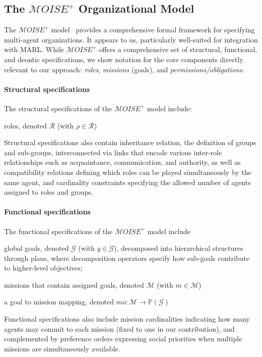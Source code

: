 \documentclass[pdflatex,sn-mathphys-num]{sn-jnl}%
\theoremstyle{thmstyleone}%
\theoremstyle{thmstyletwo}%
\theoremstyle{thmstylethree}%
\begin{document}

\subsection{The $\mathcal{M}OISE^+$ Organizational Model}

The $\mathcal{M}OISE^+$ model~\cite{Hubner2002, Hubner2007} provides a comprehensive formal framework for specifying multi-agent organizations. It appears to us, particularly well-suited for integration with MARL. While $\mathcal{M}OISE^+$ offers a comprehensive set of structural, functional, and deontic specifications, we show notation for the core components directly relevant to our approach: \textit{roles}, \textit{missions} (goals), and \textit{permissions/obligations}.

\paragraph{\textbf{Structural specifications}}
%
The structural specifications of the $\mathcal{M}OISE^+$ model include:
%
\begin{enumerate*}[label={\roman*)}, itemjoin={; \quad}]
    \item roles, denoted $\mathcal{R}$ (with $\rho \in \mathcal{R}$)
\end{enumerate*}
%
Structural specifications also contain inheritance relation, the definition of groups and sub-groups, interconnected via links that encode various inter-role relationships such as acquaintance, communication, and authority, as well as compatibility relations defining which roles can be played simultaneously by the same agent, and cardinality constraints specifying the allowed number of agents assigned to roles and groups.

\paragraph{\textbf{Functional specifications}}

The functional specifications of the $\mathcal{M}OISE^+$ model include
%
\begin{enumerate*}[label={\roman*)}, itemjoin={; \quad}]
    \item global goals, denoted $\mathcal{G}$ (with $g \in \mathcal{G}$), decomposed into hierarchical structures through plans, where decomposition operators specify how sub-goals contribute to higher-level objectives;
    \item missions that contain assigned goals, denoted $\mathcal{M}$ (with $m \in \mathcal{M}$)
    \item a goal to mission mapping, denoted $mo: \mathcal{M} \rightarrow \mathbb{P}(\mathcal{G})$
\end{enumerate*}
%
Functional specifications also include mission cardinalities indicating how many agents may commit to each mission (fixed to one in our contribution), and complemented by preference orders expressing social priorities when multiple missions are simultaneously available.
\end{document}
